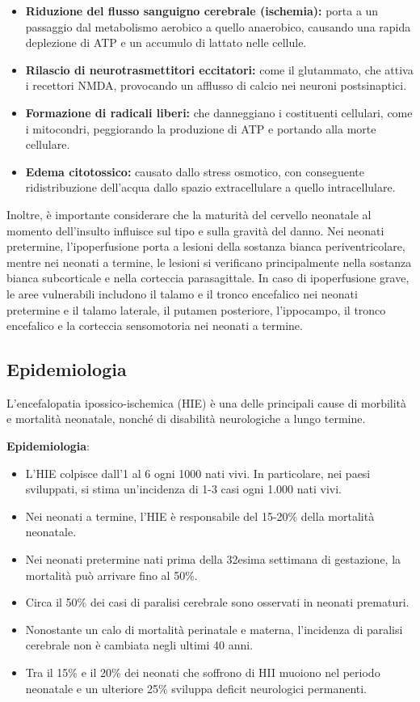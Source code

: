\begin{itemize}
	\tightlist
	\item
	\textbf{Riduzione del flusso sanguigno cerebrale (ischemia):} porta a un passaggio dal metabolismo aerobico a quello anaerobico, causando una rapida deplezione di ATP e un accumulo di lattato nelle cellule.
	\item
	\textbf{Rilascio di neurotrasmettitori eccitatori:} come il glutammato, che attiva i recettori NMDA, provocando un afflusso di calcio nei neuroni postsinaptici.
	\item
	\textbf{Formazione di radicali liberi:} che danneggiano i costituenti cellulari, come i mitocondri, peggiorando la produzione di ATP e portando alla morte cellulare.
	\item
	\textbf{Edema citotossico:} causato dallo stress osmotico, con conseguente ridistribuzione dell'acqua dallo spazio extracellulare a quello intracellulare.
\end{itemize}
Inoltre, è importante considerare che la maturità del cervello neonatale al momento dell'insulto influisce sul tipo e sulla gravità del danno. Nei neonati pretermine, l'ipoperfusione porta a lesioni della sostanza bianca periventricolare, mentre nei neonati a termine, le lesioni si verificano principalmente nella sostanza bianca subcorticale e nella corteccia parasagittale. In caso di ipoperfusione grave, le aree vulnerabili includono il talamo e il tronco encefalico nei neonati pretermine e il talamo laterale, il putamen posteriore, l'ippocampo, il tronco encefalico e la corteccia sensomotoria nei neonati a termine.

\subsection{Epidemiologia}

L'encefalopatia ipossico-ischemica (HIE) è una delle principali cause di morbilità e mortalità neonatale, nonché di disabilità neurologiche a lungo termine.

\textbf{Epidemiologia}:

\begin{itemize}
	\tightlist
	\item
	L'HIE colpisce dall'1 al 6 ogni 1000 nati vivi. In particolare, nei paesi sviluppati, si stima un'incidenza di 1-3 casi ogni 1.000 nati vivi.
	\item
	Nei neonati a termine, l'HIE è responsabile del 15-20\% della mortalità neonatale.
	\item
	Nei neonati pretermine nati prima della 32esima settimana di gestazione, la mortalità può arrivare fino al 50\%.
	\item
	Circa il 50\% dei casi di paralisi cerebrale sono osservati in neonati prematuri.
	\item
	Nonostante un calo di mortalità perinatale e materna, l'incidenza di paralisi cerebrale non è cambiata negli ultimi 40 anni.
	\item
	Tra il 15\% e il 20\% dei neonati che soffrono di HII muoiono nel periodo neonatale e un ulteriore 25\% sviluppa deficit neurologici permanenti.
\end{itemize}

